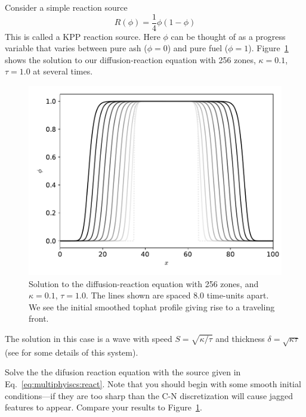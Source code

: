 Consider a simple reaction source
\begin{equation}
  \label{eq:multiphysics:react}
  R(\phi) = \frac{1}{4} \phi (1 - \phi)
\end{equation}
This is called a KPP reaction source.  Here $\phi$ can be thought of
as a progress variable that varies between pure ash ($\phi = 0$) and
pure fuel ($\phi = 1$).  Figure~\ref{fig:diffreact} shows the solution
to our diffusion-reaction equation with 256 zones, $\kappa = 0.1$,
$\tau = 1.0$ at several times.

\begin{figure}[t]
\centering
\includegraphics[width=5.0in]{flame_seq}
\caption[Solution to the diffusion-reaction equation]
  {\label{fig:diffreact} Solution to the diffusion-reaction equation
   with 256 zones, and $\kappa = 0.1$, $\tau = 1.0$.  The lines shown
   are spaced 8.0 time-units apart.  We see the initial smoothed tophat
   profile giving rise to a traveling front. \\
   }
\end{figure}

 The solution in this case is a wave with speed $S = \sqrt{\kappa/\tau}$
 and thickness $\delta = \sqrt{\kappa \tau}$ (see \cite{vladimirova2006} for
 some details of this system).

\begin{exercise}
 Solve the the difusion reaction equation with the source given in 
 Eq.~\ref{eq:multiphyiscs:react}.  Note that you should begin with
 some smooth initial conditions---if they are too sharp than the 
 C-N discretization will cause jagged features to appear.  
 Compare your results to Figure~\ref{fig:diffreact}.
\end{exercise}



